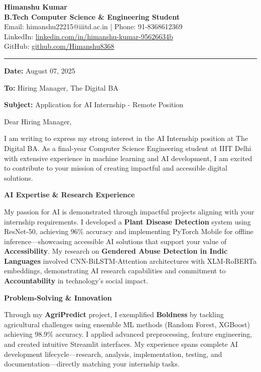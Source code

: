 \documentclass[10pt,a4paper]{article}
\begin{document}
\begin{center}
    {\Large \textbf{Himanshu Kumar}} \\
    \textbf{B.Tech Computer Science \& Engineering Student} \\
    Email: himanshu22215@iiitd.ac.in | Phone: 91-8368612369 \\
    LinkedIn: \href{https://www.linkedin.com/in/himanshu-kumar-95626634b/}{linkedin.com/in/himanshu-kumar-95626634b} \\
    GitHub: \href{https://github.com/Himanshu8368}{github.com/Himanshu8368}
\end{center}

\vspace{0.5cm}
\hrule
\vspace{0.5cm}

\textbf{Date:} August 07, 2025

\textbf{To:} Hiring Manager, The Digital BA

\textbf{Subject:} Application for AI Internship - Remote Position

Dear Hiring Manager,

I am writing to express my strong interest in the AI Internship position at The Digital BA. As a final-year Computer Science Engineering student at IIIT Delhi with extensive experience in machine learning and AI development, I am excited to contribute to your mission of creating impactful and accessible digital solutions.

\textbf{AI Expertise \& Research Experience}

My passion for AI is demonstrated through impactful projects aligning with your internship requirements. I developed a \textbf{Plant Disease Detection} system using ResNet-50, achieving 96\% accuracy and implementing PyTorch Mobile for offline inference—showcasing accessible AI solutions that support your value of \textbf{Accessibility}. My research on \textbf{Gendered Abuse Detection in Indic Languages} involved CNN-BiLSTM-Attention architectures with XLM-RoBERTa embeddings, demonstrating AI research capabilities and commitment to \textbf{Accountability} in technology's social impact.

\textbf{Problem-Solving \& Innovation}

Through my \textbf{AgriPredict} project, I exemplified \textbf{Boldness} by tackling agricultural challenges using ensemble ML methods (Random Forest, XGBoost) achieving 98.9\% accuracy. I applied advanced preprocessing, feature engineering, and created intuitive Streamlit interfaces. My experience spans complete AI development lifecycle—research, analysis, implementation, testing, and documentation—directly matching your internship tasks.
\end{document}
